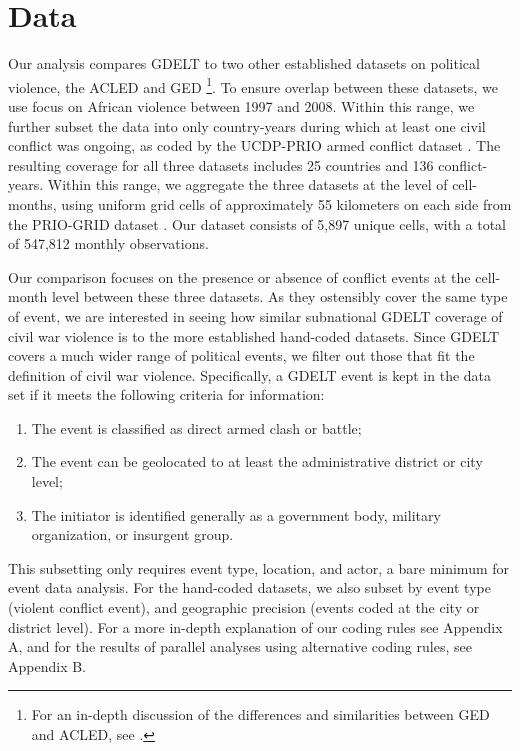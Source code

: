 \documentclass[hidelinks]{article}
\begin{document}
\section*{Data}

Our analysis compares GDELT to two other established datasets on political violence, the ACLED \citep{raleigh10acled} and GED \citep{sundberg13introducing}\footnote{For an in-depth discussion of the differences and similarities between GED and ACLED, see \citep{eck12ged}.}. To ensure overlap between these datasets, we use focus on African violence between 1997 and 2008. Within this range, we further subset the data into only country-years during which at least one civil conflict was ongoing, as coded by the UCDP-PRIO armed conflict dataset \citep{themner13armed}. The resulting coverage for all three datasets includes 25 countries and 136 conflict-years. Within this range, we aggregate the three datasets at the level of cell-months, using uniform grid cells of approximately 55 kilometers on each side from the PRIO-GRID dataset \citep{tollefsen12priogrid}. Our dataset consists of 5,897 unique cells, with a total of 547,812 monthly observations.

Our comparison focuses on the presence or absence of conflict events at the cell-month level between these three datasets. As they ostensibly cover the same type of event, we are interested in seeing how similar subnational GDELT coverage of civil war violence is to the more established hand-coded datasets. Since GDELT covers a much wider range of political events, we filter out those that fit the definition of civil war violence. Specifically, a GDELT event is kept in the data set if it meets the following criteria for information:
\begin{enumerate}
\item The event is classified as direct armed clash or battle;
\item The event can be geolocated to at least the administrative district or city level;
\item The initiator is identified generally as a government body, military organization, or insurgent group.
\end{enumerate}
This subsetting only requires event type, location, and actor, a bare minimum for event data analysis. For the hand-coded datasets, we also subset by event type (violent conflict event), and geographic precision (events coded at the city or district level). For a more in-depth explanation of our coding rules see Appendix A, and for the results of parallel analyses using alternative coding rules, see Appendix B. 
\end{document}
